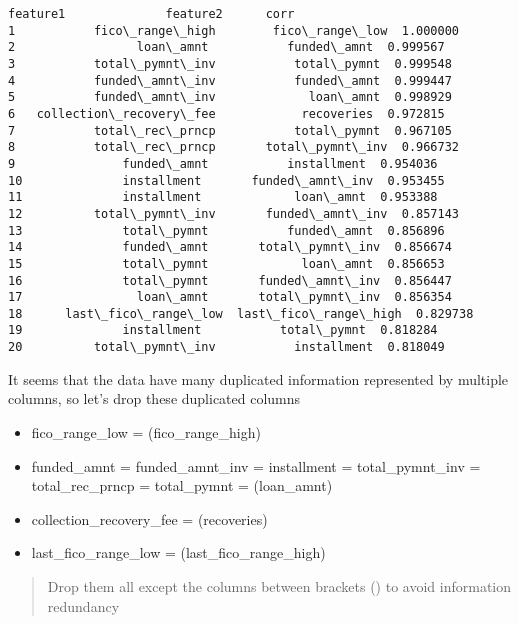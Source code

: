 \documentclass[11pt]{article}
\makeatletter
\providecommand{\tightlist}{%
      \setlength{\itemsep}{0pt}\setlength{\parskip}{0pt}}
\newcommand{\boxspacing}{\kern\kvtcb@left@rule\kern\kvtcb@boxsep}
\newcommand{\prompt}[4]{
        {\ttfamily\llap{{\color{#2}[#3]:\hspace{3pt}#4}}\vspace{-\baselineskip}}
    }
\makeatother
\begin{document}
            \begin{tcolorbox}[breakable, size=fbox, boxrule=.5pt, pad at break*=1mm, opacityfill=0]
\prompt{Out}{outcolor}{42}{\boxspacing}
\begin{Verbatim}[commandchars=\\\{\}]
                   feature1              feature2      corr
1           fico\_range\_high        fico\_range\_low  1.000000
2                 loan\_amnt           funded\_amnt  0.999567
3           total\_pymnt\_inv           total\_pymnt  0.999548
4           funded\_amnt\_inv           funded\_amnt  0.999447
5           funded\_amnt\_inv             loan\_amnt  0.998929
6   collection\_recovery\_fee            recoveries  0.972815
7           total\_rec\_prncp           total\_pymnt  0.967105
8           total\_rec\_prncp       total\_pymnt\_inv  0.966732
9               funded\_amnt           installment  0.954036
10              installment       funded\_amnt\_inv  0.953455
11              installment             loan\_amnt  0.953388
12          total\_pymnt\_inv       funded\_amnt\_inv  0.857143
13              total\_pymnt           funded\_amnt  0.856896
14              funded\_amnt       total\_pymnt\_inv  0.856674
15              total\_pymnt             loan\_amnt  0.856653
16              total\_pymnt       funded\_amnt\_inv  0.856447
17                loan\_amnt       total\_pymnt\_inv  0.856354
18      last\_fico\_range\_low  last\_fico\_range\_high  0.829738
19              installment           total\_pymnt  0.818284
20          total\_pymnt\_inv           installment  0.818049
\end{Verbatim}
\end{tcolorbox}
        
    It seems that the data have many duplicated information represented by
multiple columns, so let's drop these duplicated columns

\begin{itemize}
\tightlist
\item
  fico\_range\_low = (fico\_range\_high)
\item
  funded\_amnt = funded\_amnt\_inv = installment = total\_pymnt\_inv =
  total\_rec\_prncp = total\_pymnt = (loan\_amnt)
\item
  collection\_recovery\_fee = (recoveries)
\item
  last\_fico\_range\_low = (last\_fico\_range\_high)
\end{itemize}

\begin{quote}
Drop them all except the columns between brackets () to avoid
information redundancy
\end{quote}
\end{document}
